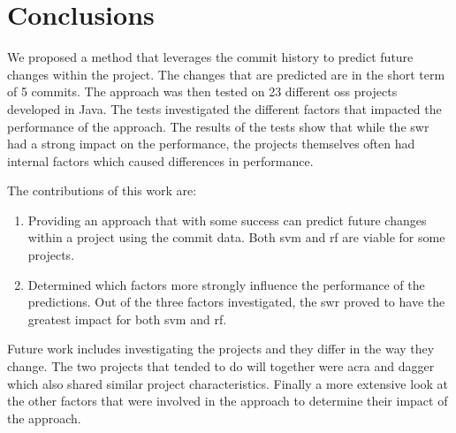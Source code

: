 \chapter{Conclusions}
\label{chap:conclusions}


We proposed a method that leverages the commit history to predict future changes within the project. The changes that are predicted are in the short term of 5 commits. The approach was then tested on 23 different \gls{oss} projects developed in Java. The tests investigated the different factors that impacted the performance of the approach. The results of the tests show that while the \gls{swr} had a strong impact on the performance, the projects themselves often had internal factors which caused differences in performance.

The contributions of this work are:
\begin{enumerate}
\item Providing an approach that with some success can predict future changes within a project using the commit data. Both \gls{svm} and \gls{rf} are viable for some projects.
\item Determined which factors more strongly influence the performance of the predictions. Out of the three factors investigated, the \gls{swr} proved to have the greatest impact for both \gls{svm} and \gls{rf}.
\end{enumerate}

Future work includes investigating the projects and they differ in the way they change. The two projects that tended to do will together were acra and dagger which also shared similar project characteristics. Finally a more extensive look at the other factors that were involved in the approach to determine their impact of the approach.



